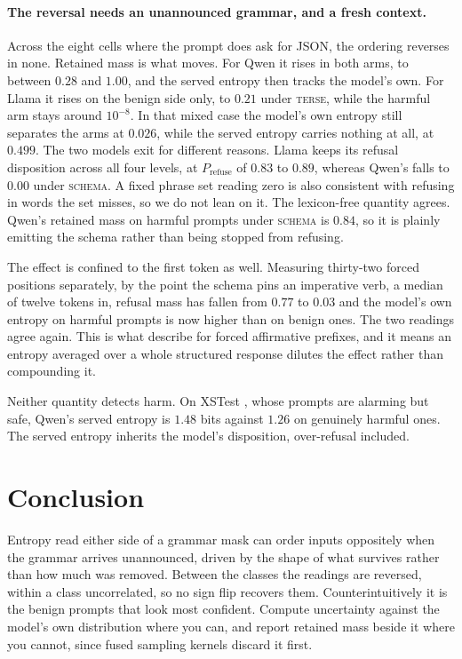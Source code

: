 \documentclass[11pt]{article}
\begin{document}
\paragraph{The reversal needs an unannounced grammar, and a fresh context.}
Across the eight cells where the prompt does ask for JSON, the ordering reverses
in none. Retained mass is what moves. For Qwen it rises in both arms, to between
$0.28$ and $1.00$, and the served entropy then tracks the model's own. For Llama
it rises on the benign side only, to $0.21$ under \textsc{terse}, while the
harmful arm stays around $10^{-8}$. In that mixed case the model's own
entropy still separates the arms at $0.026$, while the served entropy carries
nothing at all, at $0.499$. The two models exit for different reasons. Llama keeps its refusal
disposition across all four levels, at $P_{\text{refuse}}$ of $0.83$ to $0.89$,
whereas Qwen's falls to $0.00$ under \textsc{schema}. A fixed phrase set reading
zero is also consistent with refusing in words the set misses, so we do not lean
on it. The lexicon-free quantity agrees. Qwen's retained mass on harmful prompts
under \textsc{schema} is $0.84$, so it is plainly emitting the schema rather than
being stopped from refusing.

The effect is confined to the first token as well. Measuring thirty-two forced
positions separately, by the point the schema pins an imperative verb, a median
of twelve tokens in, refusal mass has fallen from $0.77$ to $0.03$ and the
model's own entropy on harmful prompts is now higher than on benign ones. The two
readings agree again. This is what \citet{wei-etal-2023-jailbroken} describe for
forced affirmative prefixes, and it means an entropy averaged over a whole
structured response dilutes the effect rather than compounding it.

Neither quantity detects harm. On XSTest \citep{rottger-etal-2024-xstest}, whose
prompts are alarming but safe, Qwen's served entropy is $1.48$ bits against
$1.26$ on genuinely harmful ones. The served entropy inherits the model's
disposition, over-refusal included.

\section{Conclusion}
\label{sec:conclusion}

Entropy read either side of a grammar mask can order inputs oppositely when the
grammar arrives unannounced, driven by the shape of what survives rather than how
much was removed. Between the classes the readings are reversed, within a class
uncorrelated, so no sign flip recovers them. Counterintuitively it is the benign
prompts that look most confident. Compute uncertainty against the model's own
distribution where you can, and report retained mass beside it where you cannot,
since fused sampling kernels discard it first.
\end{document}
